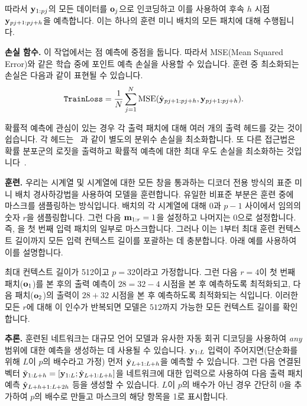 \documentclass{article}
\begin{document}
따라서 $\mathbf{y}_{1:pj}$의 모든 데이터를 $\mathbf{o}_j$으로 인코딩하고 이를 사용하여 후속 $h$ 시점 ​​$\mathbf{y}_{pj+1: pj + h}$을 예측합니다. 이는 하나의 훈련 미니 배치의 모든 패치에 대해 수행됩니다.

{\bf 손실 함수.} 이 작업에서는 점 예측에 중점을 둡니다. 따라서 MSE(Mean Squared Error)와 같은 학습 중에 포인트 예측 손실을 사용할 수 있습니다. 훈련 중 최소화되는 손실은 다음과 같이 표현될 수 있습니다.
\begin{align}
    \texttt{TrainLoss} = \frac{1}{N}\sum_{j=1}^{N} \mathrm{MSE}\left(\hat{\*y}_{pj+1: pj + h}, \*y_{pj+1: pj + h}\right).
\end{align}

확률적 예측에 관심이 있는 경우 각 출력 패치에 대해 여러 개의 출력 헤드를 갖는 것이 쉽습니다. 각 헤드는 ~\citep{wen2017multi}과 같이 별도의 분위수 손실을 최소화합니다. 또 다른 접근법은 확률 분포군의 로짓을 출력하고 확률적 예측에 대한 최대 우도 손실을 최소화하는 것입니다~\citep{awasthi2021benefits,salinas2020deepar}.

{\bf 훈련.} 우리는 시계열 및 시계열에 대한 모든 창을 통과하는 디코더 전용 방식의 표준 미니 배치 경사하강법을 사용하여 모델을 훈련합니다. 유일한 비표준 부분은 훈련 중에 마스크를 샘플링하는 방식입니다. 배치의 각 시계열에 대해 $0$과 $p-1$ 사이에서 임의의 숫자 $r$을 샘플링합니다. 그런 다음 $\mathbf{m}_{1:r} = 1$을 설정하고 나머지는 0으로 설정합니다. 즉, 을 첫 번째 입력 패치의 일부로 마스크합니다. 그러나 이는 1부터 최대 훈련 컨텍스트 길이까지 모든 입력 컨텍스트 길이를 포괄하는 데 충분합니다. 아래 예를 사용하여 이를 설명합니다.

최대 컨텍스트 길이가 512이고 $p=32$이라고 가정합니다. 그런 다음 $r=4$이 첫 번째 패치($\mathbf{o}_1$)를 본 후의 출력 예측이 $28=32-4$ 시점을 본 후 예측하도록 최적화되고, 다음 패치($\mathbf{o}_2$)의 출력이 $28+32$ 시점을 본 후 예측하도록 최적화되는 식입니다. 이러한 모든 $r$에 대해 이 인수가 반복되면 모델은 $512$까지 가능한 모든 컨텍스트 길이를 확인합니다.

{\bf 추론.} 훈련된 네트워크는 대규모 언어 모델과 유사한 자동 회귀 디코딩을 사용하여 \textit{any} 범위에 대한 예측을 생성하는 데 사용될 수 있습니다. $\mathbf{y}_{1:L}$ 입력이 주어지면(단순화를 위해 $L$이 $p$의 배수라고 가정) 먼저 $\hat{\mathbf{y}}_{L+1: L + h}$을 예측할 수 있습니다. 그런 다음 연결된 벡터 $\tilde{\mathbf{y}}_{1:L+h} = [\mathbf{y}_{1:L}; \hat{\mathbf{y}}_{L+1: L + h}]$을 네트워크에 대한 입력으로 사용하여 다음 출력 패치 예측 $\hat{\mathbf{y}}_{L+h+1: L + 2h}$ 등을 생성할 수 있습니다. $L$이 $p$의 배수가 아닌 경우 간단히 0을 추가하여 $p$의 배수로 만들고 마스크의 해당 항목을 1로 표시합니다.
\end{document}
